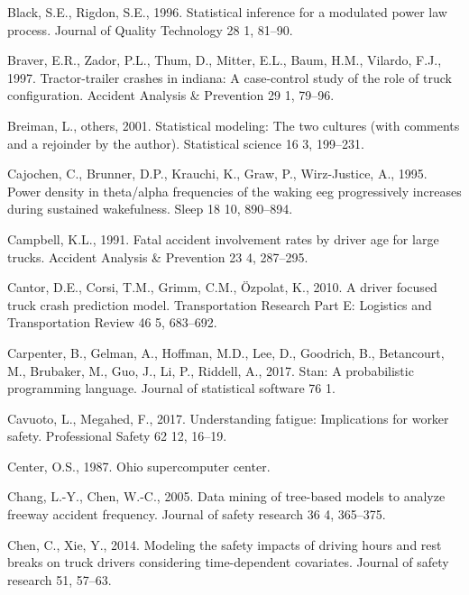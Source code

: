 \documentclass[12pt]{book}
\numberwithin{equation}{chapter}
\begin{document}
\leavevmode\hypertarget{ref-black1996statistical}{}%
Black, S.E., Rigdon, S.E., 1996. Statistical inference for a modulated power law process. Journal of Quality Technology 28 1, 81--90.

\leavevmode\hypertarget{ref-braver1997tractor}{}%
Braver, E.R., Zador, P.L., Thum, D., Mitter, E.L., Baum, H.M., Vilardo, F.J., 1997. Tractor-trailer crashes in indiana: A case-control study of the role of truck configuration. Accident Analysis \& Prevention 29 1, 79--96.

\leavevmode\hypertarget{ref-breiman2001statistical}{}%
Breiman, L., others, 2001. Statistical modeling: The two cultures (with comments and a rejoinder by the author). Statistical science 16 3, 199--231.

\leavevmode\hypertarget{ref-cajochen1995power}{}%
Cajochen, C., Brunner, D.P., Krauchi, K., Graw, P., Wirz-Justice, A., 1995. Power density in theta/alpha frequencies of the waking eeg progressively increases during sustained wakefulness. Sleep 18 10, 890--894.

\leavevmode\hypertarget{ref-campbell1991fatal}{}%
Campbell, K.L., 1991. Fatal accident involvement rates by driver age for large trucks. Accident Analysis \& Prevention 23 4, 287--295.

\leavevmode\hypertarget{ref-cantor2010driver}{}%
Cantor, D.E., Corsi, T.M., Grimm, C.M., Özpolat, K., 2010. A driver focused truck crash prediction model. Transportation Research Part E: Logistics and Transportation Review 46 5, 683--692.

\leavevmode\hypertarget{ref-carpenter2017stan}{}%
Carpenter, B., Gelman, A., Hoffman, M.D., Lee, D., Goodrich, B., Betancourt, M., Brubaker, M., Guo, J., Li, P., Riddell, A., 2017. Stan: A probabilistic programming language. Journal of statistical software 76 1.

\leavevmode\hypertarget{ref-cavuoto2017understanding}{}%
Cavuoto, L., Megahed, F., 2017. Understanding fatigue: Implications for worker safety. Professional Safety 62 12, 16--19.

\leavevmode\hypertarget{ref-OSC1987}{}%
Center, O.S., 1987. Ohio supercomputer center.

\leavevmode\hypertarget{ref-chang2005data}{}%
Chang, L.-Y., Chen, W.-C., 2005. Data mining of tree-based models to analyze freeway accident frequency. Journal of safety research 36 4, 365--375.

\leavevmode\hypertarget{ref-chen2014modeling}{}%
Chen, C., Xie, Y., 2014. Modeling the safety impacts of driving hours and rest breaks on truck drivers considering time-dependent covariates. Journal of safety research 51, 57--63.
\end{document}
